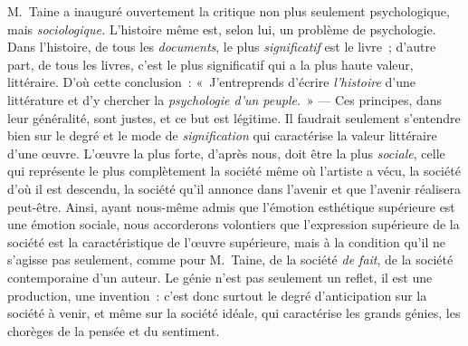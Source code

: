 \documentclass[french,twoside]{book} %
\begin{document}
M. Taine a inauguré ouvertement la critique non plus seulement psychologique, mais \emph{sociologique.} L’histoire même est, selon lui, un problème de psychologie. Dans l’histoire, de tous les \emph{documents}, le plus \emph{significatif} est le livre ; d’autre part, de tous les livres, c’est le plus significatif qui a la plus haute valeur, littéraire. D’où cette conclusion : « J’entreprends d’écrire \emph{l’histoire} d’une littérature et d’y chercher la \emph{psychologie d’un peuple}. » — Ces principes, dans leur généralité, sont justes, et ce but est légitime. Il faudrait seulement s’entendre bien sur le degré et le mode de \emph{signification} qui caractérise la valeur littéraire d’une œuvre. L’œuvre la plus forte, d’après nous, doit être la plus \emph{sociale}, celle qui représente le plus complètement la société même où l’artiste a vécu, la société d’où il est descendu, la société qu’il annonce dans l’avenir et que l’avenir réalisera peut-être. Ainsi, ayant nous-même admis que l’émotion esthétique supérieure est une émotion sociale, nous accorderons volontiers que l’expression supérieure de la société est la caractéristique de l’œuvre supérieure, mais à la condition qu’il ne s’agisse pas seulement, comme pour M. Taine, de la société \emph{de fait}, de la société contemporaine d’un auteur. Le génie n’est pas seulement un reflet, il est une production, une invention : c’est donc surtout le degré d’anticipation sur la société à venir, et même sur la société idéale, qui caractérise les grands génies, les chorèges de la pensée et du sentiment.\par
\end{document}
